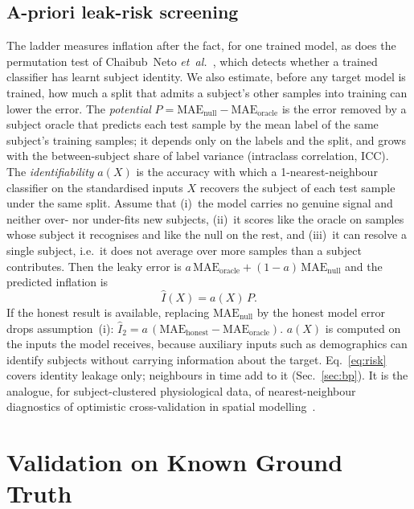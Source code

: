 \documentclass[journal]{IEEEtran}
\begin{document}
\subsection{A-priori leak-risk screening}
\label{sec:risk}
The ladder measures inflation after the fact, for one trained model, as does
the permutation test of Chaibub~Neto \emph{et~al.}~\cite{chaibubneto2019}, which
detects whether a trained classifier has learnt subject identity.  We also
estimate, before any target model is trained, how much a split that admits a
subject's other samples into training can lower the error.  The
\emph{potential} $P=\mathrm{MAE}_{\mathrm{null}}-\mathrm{MAE}_{\mathrm{oracle}}$ is
the error removed by a subject oracle that predicts each test sample by the
mean label of the same subject's training samples; it depends only on the
labels and the split, and grows with the between-subject share of label
variance (intraclass correlation, ICC).  The \emph{identifiability} $a(X)$ is
the accuracy with which a 1-nearest-neighbour classifier on the standardised
inputs $X$ recovers the subject of each test sample under the same split.
Assume that (i)~the model carries no genuine signal and neither over- nor
under-fits new subjects, (ii)~it scores like the oracle on samples whose
subject it recognises and like the null on the rest, and (iii)~it can resolve
a single subject, i.e.\ it does not average over more samples than a subject
contributes.  Then the leaky error is
$a\,\mathrm{MAE}_{\mathrm{oracle}}+(1-a)\,\mathrm{MAE}_{\mathrm{null}}$ and the
predicted inflation is
\begin{equation}
  \hat{I}(X)=a(X)\,P .
  \label{eq:risk}
\end{equation}
If the honest result is available, replacing $\mathrm{MAE}_{\mathrm{null}}$ by the
honest model error drops assumption~(i):
$\hat{I}_2=a\,(\mathrm{MAE}_{\mathrm{honest}}-\mathrm{MAE}_{\mathrm{oracle}})$.
$a(X)$ is computed on the inputs the model receives, because auxiliary
inputs such as demographics can identify subjects without carrying
information about the target.  Eq.~\eqref{eq:risk} covers identity leakage
only; neighbours in time add to it (Sec.~\ref{sec:bp}).  It is the analogue,
for subject-clustered physiological data, of nearest-neighbour diagnostics of
optimistic cross-validation in spatial
modelling~\cite{mila2022nndm,meyer2019spatial}.

\section{Validation on Known Ground Truth}
\label{sec:validation}
\end{document}
